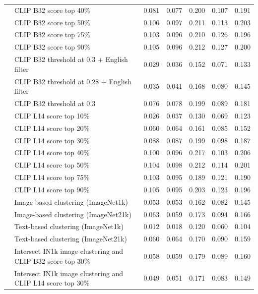\begin{table}
{\begin{tabular}{llccccc}
\cellcolor{white} & CLIP B32 score top 40\%	 & 0.081 & 0.077 & 0.200 & 0.107 & 0.191 \\
\cellcolor{white} & CLIP B32 score top 50\%	 & 0.106 & 0.097 & 0.211 & 0.113 & 0.203 \\
\cellcolor{white} & CLIP B32 score top 75\%	 & 0.103 & 0.096 & 0.210 & 0.126 & 0.196 \\
\cellcolor{white} & CLIP B32 score top 90\%	 & 0.105 & 0.096 & 0.212 & 0.127 & 0.200  \\
\cellcolor{white} & CLIP B32 threshold at 0.3 + English filter	 & 0.029 & 0.036 & 0.152 & 0.071 & 0.133  \\
\cellcolor{white} & CLIP B32 threshold at 0.28 + English filter	 & 0.035 & 0.041 & 0.168 & 0.080 & 0.145 \\
\cellcolor{white} & CLIP B32 threshold at 0.3	 & 0.076 & 0.078 & 0.199 & 0.089 & 0.181 \\
\cellcolor{white} & CLIP L14 score top 10\%	 & 0.026 & 0.037 & 0.130 & 0.069 & 0.123 \\
\cellcolor{white} & CLIP L14 score top 20\%	 & 0.060 & 0.064 & 0.161 & 0.085 & 0.152 \\
\cellcolor{white} & CLIP L14 score top 30\%	 & 0.088 & 0.087 & 0.199 & 0.098 & 0.187  \\
\cellcolor{white} & CLIP L14 score top 40\%	 & 0.100 & 0.096 & 0.217 & 0.103 & 0.206 \\
\cellcolor{white} & CLIP L14 score top 50\%	 & 0.104 & 0.098 & 0.212 & 0.114 & 0.201 \\
\cellcolor{white} & CLIP L14 score top 75\%	 & 0.103 & 0.095 & 0.189 & 0.121 & 0.190 \\
\cellcolor{white} & CLIP L14 score top 90\%	 & 0.105 & 0.095 & 0.203 & 0.123 & 0.196 \\
\cellcolor{white} & Image-based clustering (ImageNet1k)	 & 0.053 & 0.053 & 0.162 & 0.082 & 0.145 \\
\cellcolor{white} & Image-based clustering (ImageNet21k)	 & 0.063 & 0.059 & 0.173 & 0.094 & 0.166 \\
\cellcolor{white} & Text-based clustering (ImageNet1k)	 & 0.012 & 0.018 & 0.120 & 0.060 & 0.104 \\
\cellcolor{white} & Text-based clustering (ImageNet21k)	 & 0.060 & 0.064 & 0.170 & 0.090 & 0.159 \\
\cellcolor{white} & Intersect IN1k image clustering and CLIP B32 score top 30\%	 & 0.058 & 0.059 & 0.179 & 0.089 & 0.160  \\
\cellcolor{white} & Intersect IN1k image clustering and CLIP L14 score top 30\%	 & 0.049 & 0.051 & 0.171 & 0.083 & 0.149 \\

\end{tabular}}
\end{table}
